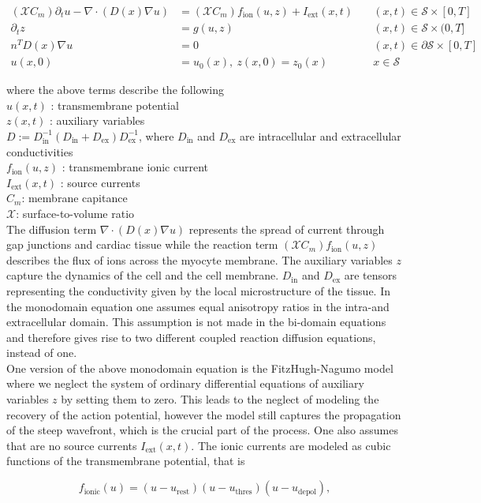 \documentclass[../draft_1.tex]{subfiles}
\begin{document}
\begin{ceqn}
	\begin{align}
	\label{mon_domain_eq}
	(\mathcal{X} C_m) \partial_t u - \nabla \cdot ( D(x) \nabla u) &= (\mathcal{X} C_m) f_{\text{ion}}(u, z) + I_{\text{ext}}(x,t)  \quad &(x,t) \in \mathcal{S} \times [0,T] \\
	\partial_t z &= g(u,z) \quad  &(x,t) \in \mathcal{S} \times (0,T] \\
	n^T D(x) \nabla u  &= 0 \qquad \qquad \qquad &(x,t) \in \partial \mathcal{S} \times [0,T] \\
	u(x,0) &= u_0(x), \ z(x,0) = z_0(x) \quad &x \in \mathcal{S} 
	\end{align}
\end{ceqn}
where the above terms describe the following 
\smallskip
\\
$u(x,t)$ : transmembrane potential \\
$z(x,t)$ : auxiliary variables \\
 $	D := D_{\text{in}}^{-1} (D_{\text{in}} + D_{\text{ex}}) D_{\text{ex}}^{-1}$, where $D_{\text{in}}$ and $ D_{\text{ex}}$ are intracellular and extracellular conductivities \\
 $ f_{\text{ion}}(u,z)$ : transmembrane ionic current \\
 $I_{\text{ext}}(x,t)$ : source currents \\
$C_m$: membrane capitance \\
$\mathcal{X}$:  surface-to-volume ratio 
\smallskip
\\
The diffusion term $\nabla \cdot ( D(x) \nabla u)$ represents the spread of current through gap junctions and cardiac tissue while the reaction term $(\mathcal{X} C_m) f_{\text{ion}}(u, z)$ describes the flux of ions across the myocyte membrane. The auxiliary variables $z$ capture the dynamics of the cell and the cell membrane. $D_{\text{in}}$ and $ D_{\text{ex}}$ are tensors representing the conductivity given by the local microstructure of the tissue. In the monodomain equation one assumes equal anisotropy ratios in the intra-and extracellular domain. This assumption is not made in the bi-domain equations and therefore gives rise to two different coupled reaction diffusion equations, instead of one. 
\smallskip
\\
One version of the above monodomain equation is the FitzHugh-Nagumo model where we neglect the system of ordinary differential equations of auxiliary variables $z$ by setting them to zero. This leads to the neglect of modeling the recovery of the action potential, however the model still captures the propagation of the steep wavefront, which is the crucial part of the process. One also assumes that are no source currents  $I_{\text{ext}}(x,t)$. The ionic currents are modeled as cubic functions of the transmembrane potential, that is 
\begin{ceqn}
	\begin{equation}
	f_{\text{ionic}} (u) = (u - u_{\text{rest}})(u - u_{\text{thres}})(u - u_{\text{depol}}),	
	\end{equation}
	\end{ceqn}
\end{document}
